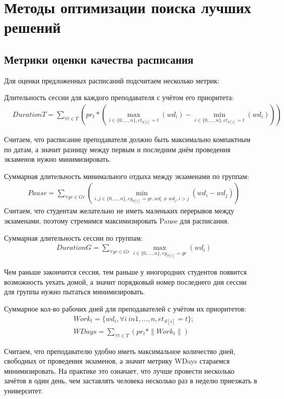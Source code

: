 \section{Методы оптимизации поиска лучших решений} \label{ch2:sec4} 
\subsection{Метрики оценки качества расписания}
Для оценки предложенных расписаний подсчитаем несколько метрик:

Длительность сессии для каждого преподавателя с учётом его приоритета:
\begin{align}
	& {DurationT} =  \sum\limits_{\forall  t \in T}(pr_t* (\max\limits_{i \in \{0,...,n\}, et_{S[i]} = t}(wd_{i}) 
	- \min\limits_{i \in \{0,...,n\}, et_{S[i]} = t}(wd_{i}) )) 
\end{align}

Считаем, что расписание преподавателя должно быть максимально компактным по датам, а значит разницу между первым и последним днём проведения экзаменов нужно минимизировать.

Суммарная длительность минимального отдыха между экзаменами по группам:
\begin{align}
	& {Pause} =  \sum\limits_{\forall  gr \in Gr}(\min\limits_{i,j \in \{0,...,n\}, eg_{S[i]} = gr, wd_i \neq wd_j, i>j}(wd_i - wd_j))
\end{align}
Считаем, что студентам желательно не иметь маленьких перерывов между экзаменами, поэтому стремимся максимизировать Pause для расписания.

Суммарная длительность сессии по группам:
\begin{align}
	& {DurationG} =  \sum\limits_{\forall  gr \in Gr}\max\limits_{i \in \{0,...,n\}, eg_{S[i]} = gr}(wd_i)
\end{align}

Чем раньше закончится сессия, тем раньше у иногородних студентов появится возможность уехать домой, а значит порядковый номер последнего дня сессии для группы нужно пытаться минимизировать.

Суммарное кол-во рабочих дней для преподавателей с учётом их приоритетов:
\begin{align}
	& Work_t = \{wd_i, \forall i \ in {1,...,n}, et_{S[i]} = t\};\\
	& {WDays} =  \sum\limits_{\forall  t \in T}(pr_t * \|Work_t\|) 
\end{align}

Считаем, что преподавателю удобно иметь максимальное количество дней, свободных от проведения экзаменов, а значит метрику WDays стараемся минимизировать. На практике это означает, что лучше провести несколько зачётов в один день, чем заставлять человека несколько раз в неделю приезжать в университет.

